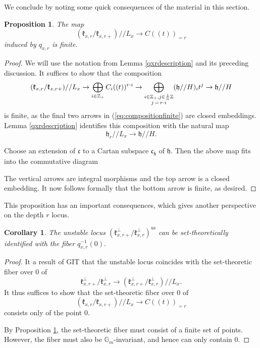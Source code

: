 \documentclass[12pt]{article}
\newcommand{\on}{\operatorname}
\newtheorem{proposition}[theorem]{Proposition}
\newtheorem{corollary}[theorem]{Corollary}
\theoremstyle{remark}
\begin{document}
We conclude by noting some quick consequences of the material in this section.

\begin{proposition}\label{finiteness}
The map
\[
(\mathfrak{k}_{x,r}/\mathfrak{k}_{x,r+})//L_x\rightarrow C((t))_{=r}
\]
induced by $q_{x,r}$ is finite.
\end{proposition}

\begin{proof}
We will use the notation from Lemma \ref{qxrdescription} and its preceding discussion. It suffices to show that the composition
\begin{equation}\label{eq:compositionfinite}
(\mathfrak{k}_{x,r}/\mathfrak{k}_{x,r+})//L_x\rightarrow\displaystyle\bigoplus_{i\in\mathbb{Z}_+}C_i((t))^{r\cdot i}\rightarrow\displaystyle\bigoplus_{\substack{i\in\mathbb{Z}_+,j\in\frac{1}{n}\mathbb{Z}\\ j\thinspace=\thinspace r\cdot i}}(\mathfrak{h}//H)_it^j\rightarrow\mathfrak{h}//H
\end{equation}
is finite, as the final two arrows in (\ref{eq:compositionfinite}) are closed embeddings. Lemma \ref{qxrdescription} identifies this composition with the natural map
\[
\mathfrak{h}_r//L_x\rightarrow\mathfrak{h}//H.
\]

Choose an extension of $\mathfrak{c}$ to a Cartan subspace $\mathfrak{c_h}$ of $\mathfrak{h}$. Then the above map fits into the commutative diagram
\begin{center}
\end{center}
The vertical arrows are integral morphisms and the top arrow is a closed embedding. It now follows formally that the bottom arrow is finite, as desired.
\end{proof}
This proposition has an important consequences, which gives another perspective on the depth $r$ locus.
\begin{corollary}\label{unstablevsfiber}
The unstable locus $(\mathfrak{k}_{x,r+}^{\perp}/\mathfrak{k}_{x,r}^{\perp})^{\on{us}}$ can be set-theoretically identified with the fiber $q_{x,r}^{-1}(0).$
\end{corollary}
\begin{proof}
It a result of GIT that the unstable locus coincides with the set-theoretic fiber over $0$ of
\[
\mathfrak{k}_{x,r+}^{\perp}/\mathfrak{k}_{x,r}^{\perp}\rightarrow(\mathfrak{k}_{x,r+}^{\perp}/\mathfrak{k}_{x,r}^{\perp})//L_x.
\]
It thus suffices to show that the set-theoretic fiber over $0$ of
\[
(\mathfrak{k}_{x,r}/\mathfrak{k}_{x,r+})//L_x\rightarrow C((t))_{=r}
\]
consists only of the point $0$.

By Proposition \ref{finiteness}, the set-theoretic fiber must consist of a finite set of points. However, the fiber must also be $\mathbb{G}_m$-invariant, and hence can only contain $0$.
\end{proof}
\end{document}
